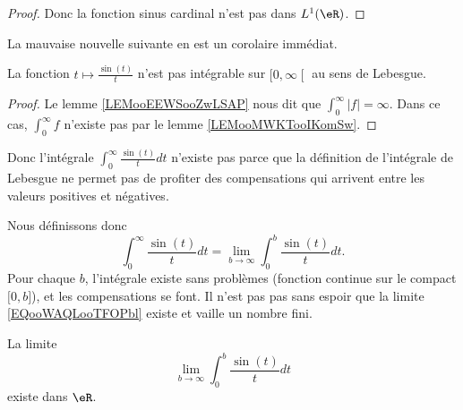 \begin{proof}
	Donc la fonction sinus cardinal n'est pas dans \( L^1(\eR)\).
\end{proof}

La mauvaise nouvelle suivante en est un corolaire immédiat.
\begin{lemma}       \label{LEMooBEQRooHaugKj}
	La fonction \( t\mapsto \frac{ \sin(t) }{ t }\) n'est pas intégrable sur \( \mathopen[ 0 , \infty \mathclose[\) au sens de Lebesgue.
\end{lemma}

\begin{proof}
	Le lemme \ref{LEMooEEWSooZwLSAP} nous dit que \( \int_0^{\infty}| f |=\infty\). Dans ce cas, \( \int_0^{\infty}f\) n'existe pas par le lemme \ref{LEMooMWKTooIKomSw}.
\end{proof}

Donc l'intégrale \( \int_0^{\infty}\frac{ \sin(t) }{ t }dt\) n'existe pas parce que la définition de l'intégrale de Lebesgue ne permet pas de profiter des compensations qui arrivent entre les valeurs positives et négatives.

Nous définissons donc
\begin{equation}        \label{EQooWAQLooTFOPbl}
	\int_0^{\infty}\frac{ \sin(t) }{ t }dt=\lim_{b\to \infty} \int_0^b\frac{ \sin(t) }{ t }dt.
\end{equation}
Pour chaque \( b\), l'intégrale existe sans problèmes (fonction continue sur le compact \( \mathopen[ 0 , b \mathclose]\)), et les compensations se font. Il n'est pas pas sans espoir que la limite \eqref{EQooWAQLooTFOPbl} existe et vaille un nombre fini.

\begin{lemma}     \label{LEMooTFVZooRAmjUN}
	La limite
	\begin{equation}
		\lim_{b\to \infty}\int_0^b\frac{ \sin(t) }{ t }dt
	\end{equation}
	existe dans \( \eR\).
\end{lemma}

